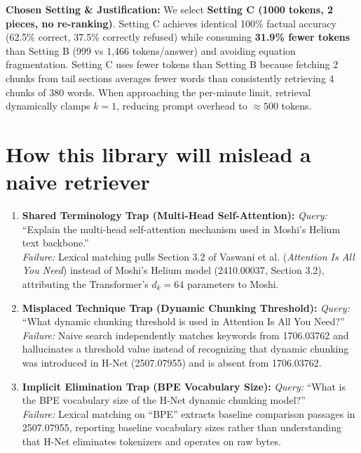 \documentclass[9pt,a4paper]{article}
\begin{document}
\vspace{2pt}
\noindent\textbf{Chosen Setting \& Justification:}  
We select \textbf{Setting C (1000 tokens, 2 pieces, no re-ranking)}. Setting C achieves identical 100\% factual accuracy (62.5\% correct, 37.5\% correctly refused) while consuming \textbf{31.9\% fewer tokens} than Setting B (999 vs 1,466 tokens/answer) and avoiding equation fragmentation. Setting C uses fewer tokens than Setting B because fetching 2 chunks from tail sections averages fewer words than consistently retrieving 4 chunks of 380 words. When approaching the per-minute limit, retrieval dynamically clamps $k=1$, reducing prompt overhead to $\approx 500$ tokens.

\section*{How this library will mislead a naive retriever}
\begin{enumerate}
    \item \textbf{Shared Terminology Trap (Multi-Head Self-Attention):}  
    \textit{Query:} ``Explain the multi-head self-attention mechanism used in Moshi's Helium text backbone.''\\
    \textit{Failure:} Lexical matching pulls Section 3.2 of Vaswani et al. (\textit{Attention Is All You Need}) instead of Moshi's Helium model (2410.00037, Section 3.2), attributing the Transformer's $d_k=64$ parameters to Moshi.
    \item \textbf{Misplaced Technique Trap (Dynamic Chunking Threshold):}  
    \textit{Query:} ``What dynamic chunking threshold is used in Attention Is All You Need?''\\
    \textit{Failure:} Naive search independently matches keywords from 1706.03762 and hallucinates a threshold value instead of recognizing that dynamic chunking was introduced in H-Net (2507.07955) and is absent from 1706.03762.
    \item \textbf{Implicit Elimination Trap (BPE Vocabulary Size):}  
    \textit{Query:} ``What is the BPE vocabulary size of the H-Net dynamic chunking model?''\\
    \textit{Failure:} Lexical matching on ``BPE'' extracts baseline comparison passages in 2507.07955, reporting baseline vocabulary sizes rather than understanding that H-Net eliminates tokenizers and operates on raw bytes.
\end{enumerate}
\end{document}
